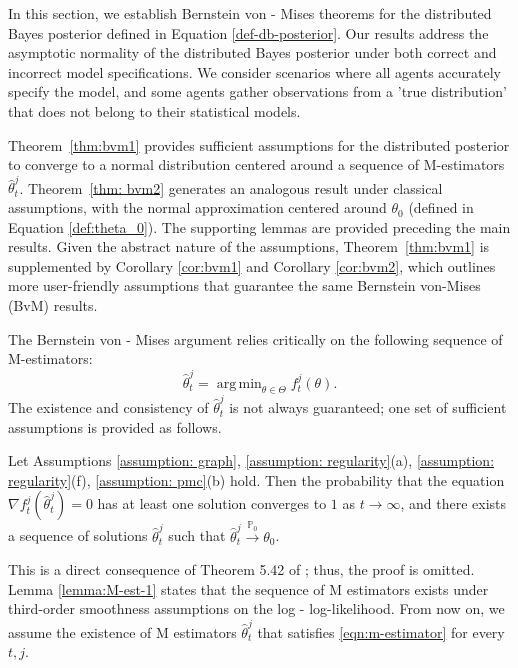 \documentclass[twoside,11pt]{article}
\numberwithin{equation}{section}
\newcommand\bP{\mathbb{P}}
\newcommand{\pto}{\stackrel{\bP_0}{\to}}
\DeclareMathOperator*{\argmin}{arg\,min}
\begin{document}
{In this section,  we establish Bernstein von - Mises theorems for the distributed Bayes posterior defined in Equation \eqref{def-db-posterior}. Our results address the asymptotic normality of the distributed Bayes posterior under both correct and incorrect model specifications. We consider scenarios where all agents accurately specify the model, and some agents gather observations from a 'true distribution' that does not belong to their statistical models.

Theorem~\ref{thm:bvm1} provides sufficient assumptions for the distributed posterior to converge to a normal distribution centered around a sequence of M-estimators $\hat \theta_t^j$. Theorem~\ref{thm: bvm2} generates an analogous result under classical assumptions, with the normal approximation centered around $\theta_0$ (defined in Equation \eqref{def:theta_0}). The supporting lemmas are provided preceding the main results. Given the abstract nature of the assumptions, Theorem~\ref{thm:bvm1} is supplemented by Corollary \ref{cor:bvm1} and Corollary \ref{cor:bvm2}, which outlines more user-friendly assumptions that guarantee the same Bernstein von-Mises (BvM) results.


The Bernstein von - Mises argument relies critically on the following sequence of M-estimators: 
\begin{equation} \label{eqn:m-estimator}
\hat \theta_t^j = \argmin_{\theta \in \Theta} f_t^j(\theta). 
\end{equation}
The existence and consistency of $\hat \theta_t^j$ is not always guaranteed; one set of sufficient assumptions is provided as follows. 


\begin{lemma}\label{lemma:M-est-1}
    Let Assumptions  \ref{assumption: graph}, \ref{assumption: regularity}(a), \ref{assumption: regularity}(f), \ref{assumption: pmc}(b) hold.  Then the probability that the equation $\nabla f_t^j(\hat \theta_t^j) = 0$ has at least one solution converges to $1$ as $t \to \infty$, and there exists a sequence of solutions $\hat \theta_t^j$ such that $\hat \theta_t^j \pto \theta_0$. 
\end{lemma}


This is a direct consequence of Theorem 5.42 of \cite{VanderVaart2000}; thus, the proof is omitted. {Lemma \ref{lemma:M-est-1}} states that the sequence of M estimators exists under third-order smoothness assumptions on the log - log-likelihood.  From now on, we assume the existence of M estimators $\hat \theta_t^j$ that satisfies \eqref{eqn:m-estimator} for every $t, j$. 

}
\end{document}

